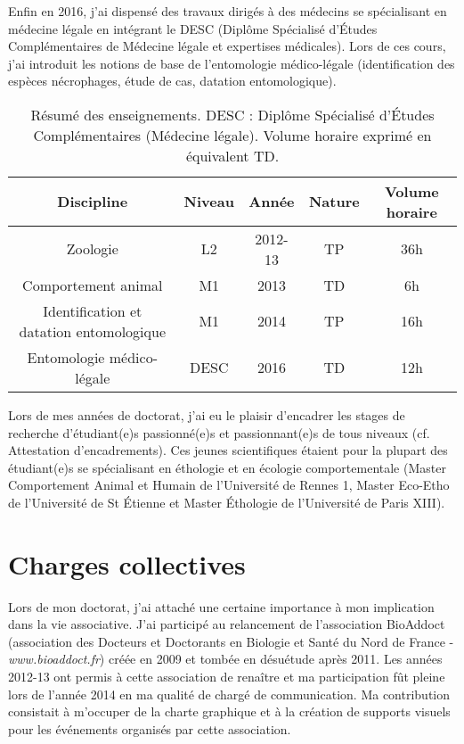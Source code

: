 \documentclass[a4paper,11pt,fleqn]{book} %
\begin{document}
Enfin en 2016, j'ai dispensé des travaux dirigés à des médecins se spécialisant en médecine légale en intégrant le DESC (Diplôme Spécialisé d’Études Complémentaires de Médecine légale et expertises médicales). Lors de ces cours, j'ai introduit les notions de base de l'entomologie médico-légale (identification des espèces nécrophages, étude de cas, datation entomologique). 

\begin{table}[h!]
	\caption{Résumé des enseignements. DESC : Diplôme Spécialisé d’Études Complémentaires (Médecine légale). Volume horaire exprimé en équivalent TD.}
	\label{tab:enseignement}
	\centering
	\begin{tabular*}{\linewidth}{@{\extracolsep{\fill}}ccccc}
		 \toprule
         \textbf{Discipline}				& \textbf{Niveau}		& \textbf{Année}		& \textbf{Nature}		& \textbf{Volume horaire}\\
		 \midrule
		Zoologie	&L2		&2012-13		&TP		&36h\\
        Comportement animal	&M1	&2013	&TD	&6h\\
        Identification et datation entomologique	&M1	&2014	&TP	&16h\\
        Entomologie médico-légale	&DESC	&2016	&TD	&12h\\
        \bottomrule
        \end{tabular*}
        \end{table}
        
Lors de mes années de doctorat, j'ai eu le plaisir d'encadrer les stages de recherche d'étudiant(e)s passionné(e)s et passionnant(e)s de tous niveaux (cf. Attestation d'encadrements). Ces jeunes scientifiques étaient pour la plupart des étudiant(e)s se spécialisant en éthologie et en écologie comportementale (Master Comportement Animal et Humain de l'Université de Rennes 1, Master Eco-Etho de l'Université de St Étienne et Master Éthologie de l'Université de Paris XIII). 

\section{Charges collectives}

Lors de mon doctorat, j'ai attaché une certaine importance à mon implication dans la vie associative. J'ai participé au relancement de l'association BioAddoct (association des Docteurs et Doctorants en Biologie et Santé du Nord de France - \textit{www.bioaddoct.fr}) créée en 2009 et tombée en désuétude après 2011. Les années 2012-13 ont permis à cette association de renaître et ma participation fût pleine lors de l'année 2014 en ma qualité de chargé de communication. Ma contribution consistait à m'occuper de la charte graphique et à la création de supports visuels pour les événements organisés par cette association.
\end{document}
